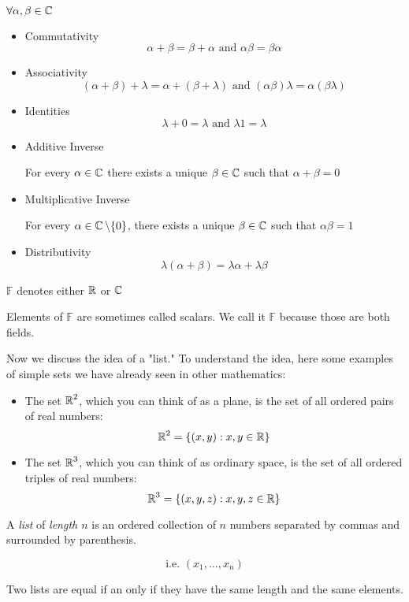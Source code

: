 \begin{note}
    $\forall \alpha, \beta \in \operatorname{\mathbb{C}}$
    \begin{itemize}
        \item Commutativity
        \[ \alpha + \beta = \beta + \alpha \text{ and } \alpha \beta = \beta \alpha\]
        \item Associativity
        \[ (\alpha + \beta) + \lambda = \alpha + (\beta + \lambda) \text{ and } (\alpha\beta)\lambda = \alpha(\beta \lambda) \]
        \item Identities
        \[ \lambda + 0 = \lambda \text{ and } \lambda 1 = \lambda \]
        \item Additive Inverse
        \begin{center}
           For every $\alpha \in \operatorname{\mathbb{C}}$ there exists a unique $\beta \in \operatorname{\mathbb{C}}$ such that $\alpha + \beta = 0$ 
        \end{center}
        \item Multiplicative Inverse
        \begin{center}
            For every  $\alpha \in \operatorname{\mathbb{C}} \setminus \{0\}$, there exists a unique $\beta \in \operatorname{\mathbb{C}}$ such that $\alpha \beta = 1$ 
        \end{center}
        \item Distributivity
        \[ \lambda(\alpha + \beta) = \lambda \alpha + \lambda \beta \]
    \end{itemize}
\end{note}

\begin{definition}[$\F$]
    $\mathbb{F}$ denotes either $\operatorname{\mathbb{R}}$ or $\operatorname{\mathbb{C}}$
\end{definition}
Elements of $\mathbb{F}$ are sometimes called scalars.
We call it $\mathbb{F}$ because those are both fields.

Now we discuss the idea of a "list." To understand the idea, here some examples of
simple sets we have already seen in other mathematics:
\begin{itemize}
    \item The set $\operatorname{\mathbb{R}}^2$, which you can think of as a plane, is the set of all ordered
    pairs of real numbers:
    \[ \operatorname{\mathbb{R}}^2 = \{(x, y) : x, y \in \operatorname{\mathbb{R}}\} \]
    \item The set $\operatorname{\mathbb{R}}^3$, which you can think of as ordinary space, is the set of all
    ordered triples of real numbers:
    \[ \operatorname{\mathbb{R}}^3 = \{(x, y, z) : x, y, z \in \operatorname{\mathbb{R}}\} \]
\end{itemize}

\begin{definition}[List]
    A \textit{list} of \textit{length $n$} is an ordered collection of $n$ numbers
    separated by commas and surrounded by parenthesis.
    
    \[ \text{i.e. }(x_1, \ldots, x_n) \]
    
    Two lists are equal if an only if they have the same length and the same elements. 
\end{definition}


